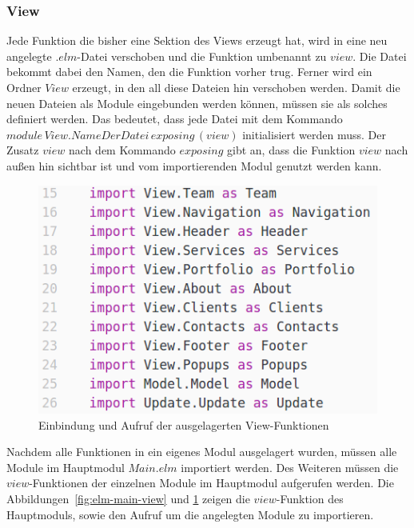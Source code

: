 \subsubsection{View}
\label{sec:auslagern-view}
Jede Funktion die bisher eine Sektion des Views erzeugt hat, wird in eine neu angelegte $.elm$-Datei verschoben und die Funktion umbenannt zu $view$. Die Datei bekommt dabei den Namen, den die Funktion vorher trug. Ferner wird ein Ordner $View$ erzeugt, in den all diese Dateien hin verschoben werden. Damit die neuen Dateien als Module eingebunden werden können, müssen sie als solches definiert werden. Das bedeutet, dass jede Datei mit dem Kommando $module\,View.NameDerDatei\,exposing\,(view)$ initialisiert werden muss. Der Zusatz $view$ nach dem Kommando $exposing$ gibt an, dass die Funktion $view$ nach außen hin sichtbar ist und vom importierenden Modul genutzt werden kann.
\begin{figure}[hbt]
\centering
\includegraphics[scale=0.5]{img/imports-main.png}
\caption{Einbindung und Aufruf der ausgelagerten View-Funktionen}\label{fig:elm-main-view-imports}
\end{figure}
Nachdem alle Funktionen in ein eigenes Modul ausgelagert wurden, müssen alle Module im Hauptmodul $Main.elm$ importiert werden. Des Weiteren müssen die $view$-Funktionen der einzelnen Module im Hauptmodul aufgerufen werden. Die Abbildungen~\ref{fig:elm-main-view} und \ref{fig:elm-main-view-imports} zeigen die $view$-Funktion des Hauptmoduls, sowie den Aufruf um die angelegten Module zu importieren.
